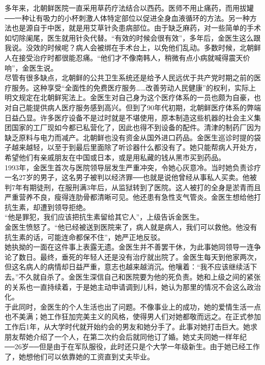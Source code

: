 \begin{multicols}{\theparacolNo}
多年来，北朝鲜医院一直采用草药疗法结合以西药。医师不用止痛药，而用拔罐──一种让有吸力的小杯刺激人体特定部位以促进全身血液循环的方法。另一种方法也是源自于中医，就是用艾草针灸患病部位。由于缺乏麻药，对一些简单的手术如切除阑尾，医生就用针灸代替。“有效的时候会很有效”，多年后，金医生这么跟我说。没效的时候呢？病人会被绑在手术台上，以免他们乱动。多数时候，北朝鲜人在接受治疗时都很能忍痛。“他们才不像南韩人，稍微有点小病就喊得震天价响”，金医生说。\\

尽管有很多缺点，北朝鲜的公共卫生系统还是给予人民远优于共产党时期之前的医疗服务。这种享受“全面性的免费医疗服务……改善劳动人民健康”的权利，实际上明文规定在北朝鲜宪法上。金医生对自己身为这个医疗体系的一员也颇为自豪，也对自己能提供病人医疗服务感到高兴。但到了90年代初期，北朝鲜医疗体系的弊端日益凸显。许多医疗设备不是过时就是不堪使用，原本制造这些机器的社会主义集团国家的工厂现如今都已私营化了，因此也得不到设备的配件。清津的制药厂因为缺乏原料与电力而减产。北朝鲜也没有资金从国外进口药品。金医生巡诊时提的袋子越来越轻，以至于到最后里面除了听诊器什么都没有了。她只能帮病人开处方，希望他们有亲戚朋友在中国或日本，或是用私藏的钱从黑市买到药品。\\

1993年，金医生首次与医院领导层发生严重冲突，令她心灰意冷。当时她负责诊疗一名27岁的男子，这名男子被判以经济罪──也就是说他曾经从事私人买卖。他被判7年有期徒刑，在服刑满3年后，从监狱转到了医院。这人被打的全身是淤青而且严重营养不良，瘦得连肋骨都清晰可见。他还患有急性支气管炎。金医生想给他打抗生素，却遭到领导拒绝。\\

“他是罪犯，我们应该把抗生素留给其它人”，上级告诉金医生。\\

金医生愤怒了。“他已经被送到医院来了，病人就是病人，我们可以救他。他没有抗生素的话，可能连命都保不住”，她严正地反驳。\\

她执拗的一面在这件事上表露无遗。金医生并不善罢干休，为此事她同领导一连争论了数日。最终，垂死的年轻人还是没有治疗就出院了。金医生每天到他家两次，但这名病人的病情却日益严重，意志也越来越消沉。他嚷着：“我不应该继续活下去。”不久就自杀了。金医生深信自己和医院要为他的死负责。她和上级之间的紧张的关系也一直持续着，于是她主动申请调到儿科，她认为那里的情况不会这么政治化。\\

于此同时，金医生的个人生活也出了问题。不像事业上的成功，她的爱情生活一点也不美满；她工作狂加完美主义的风格，使得男人们对她都敬而远之。在正式参加工作后1年，从大学时代就开始约会的男友和她分手了。此事对她打击巨大。她求朋友帮她介绍了一个人，在第二次约会后就同他订了婚。她丈夫同她一样年纪──26岁──但是由于在军队服役，此时还只是个大学一年级新生。由于她已经工作了，她想他们可以依靠她的工资直到丈夫毕业。\\


\end{multicols}

